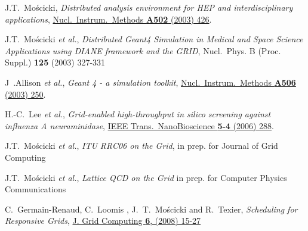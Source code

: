 \documentclass{elsart}
\def\etal {\textit{et al.}}
\begin{document}
\begin{thebibliography}{00}
 J.T.~Mo\'scicki,
\textit{Distributed analysis environment for HEP and interdisciplinary
applications},
\href{http://dx.doi.org/10.1016/S0168-9002(03)00459-5}
{Nucl.\ Instrum.\ Methods \textbf{A502} (2003) 426}.

 J.T.~Mo\'scicki \etal,
\textit{Distributed Geant4 Simulation in Medical and Space Science Applications
using DIANE framework and the GRID},
{Nucl.\ Phys. B (Proc. Suppl.) \textbf{125} (2003) 327-331}

 J~.Allison \etal,
\textit{Geant 4 - a simulation toolkit},
\href{http://dx.doi.org/10.1016/S0168-9002(03)01368-8}
{Nucl.\ Instrum.\ Methods \textbf{A506} (2003) 250}.

 H.-C.\ Lee \etal,
\textit{Grid-enabled high-throughput in silico screening against influenza A
neuraminidase},
\href{http://dx.doi.org/10.1109/TNB.2006.887943}
{IEEE Trans.\ NanoBioscience \textbf{5-4} (2006) 288}.

 J.T.~Mo\'scicki \etal,
\textit{ITU RRC06 on the Grid},
{in prep. for Journal of Grid Computing }

 J.T.~Mo\'scicki \etal,
\textit{Lattice QCD on the Grid}
{in prep. for Computer Physics Communications}

  C.~Germain-Renaud, C.~Loomis , J.~T.~Mo{\'s}cicki and R.~Texier,
\textit{Scheduling for Responsive Grids}, 
\href{http://dx/doi.org/10.1007/s10723-007-9086-4}
{J. Grid Computing \textbf{6}, (2008) 15-27 }







\end{thebibliography}
\end{document}
